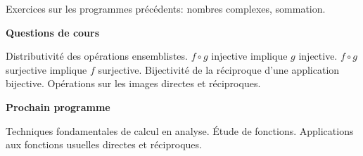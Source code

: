 





Exercices sur les programmes précédents: nombres complexes, sommation.




\bigskip
\begin{center}
 \textbf{Questions de cours}
\end{center}
Distributivité des opérations ensemblistes. $f\circ g$ injective implique $g$ injective. $f\circ g$ surjective implique $f$ surjective. Bijectivité de la réciproque d'une application bijective. Opérations sur les images directes et réciproques. 

\begin{center}
 \textbf{Prochain programme}
\end{center}
Techniques fondamentales de calcul en analyse. \'Etude de fonctions. Applications aux fonctions usuelles directes et réciproques.

